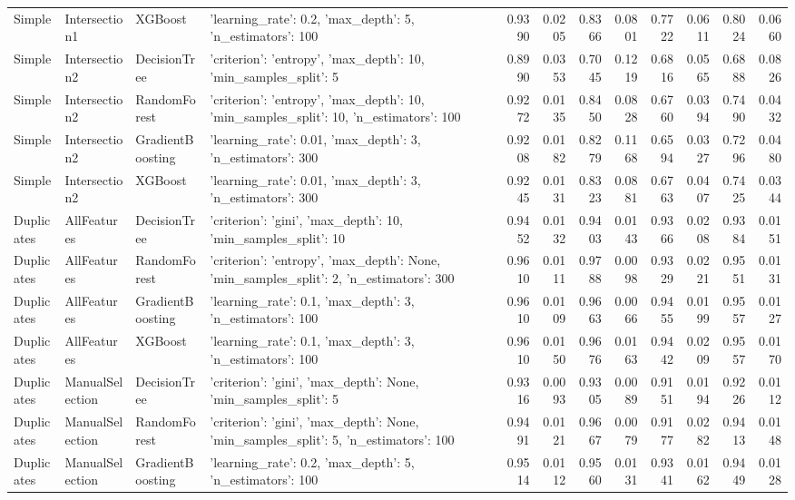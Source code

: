 \begin{tabular}{llllrrrrrrrr}
Simple & Intersection1 & XGBoost & {'learning_rate': 0.2, 'max_depth': 5, 'n_estimators': 100} & 0.9390 & 0.0205 & 0.8366 & 0.0801 & 0.7722 & 0.0611 & 0.8024 & 0.0660 \\
Simple & Intersection2 & DecisionTree & {'criterion': 'entropy', 'max_depth': 10, 'min_samples_split': 5} & 0.8990 & 0.0353 & 0.7045 & 0.1219 & 0.6816 & 0.0565 & 0.6888 & 0.0826 \\
Simple & Intersection2 & RandomForest & {'criterion': 'entropy', 'max_depth': 10, 'min_samples_split': 10, 'n_estimators': 100} & 0.9272 & 0.0135 & 0.8450 & 0.0828 & 0.6760 & 0.0394 & 0.7490 & 0.0432 \\
Simple & Intersection2 & GradientBoosting & {'learning_rate': 0.01, 'max_depth': 3, 'n_estimators': 300} & 0.9208 & 0.0182 & 0.8279 & 0.1168 & 0.6594 & 0.0327 & 0.7296 & 0.0480 \\
Simple & Intersection2 & XGBoost & {'learning_rate': 0.01, 'max_depth': 3, 'n_estimators': 300} & 0.9245 & 0.0131 & 0.8323 & 0.0881 & 0.6763 & 0.0407 & 0.7425 & 0.0344 \\
Duplicates & AllFeatures & DecisionTree & {'criterion': 'gini', 'max_depth': 10, 'min_samples_split': 10} & 0.9452 & 0.0132 & 0.9403 & 0.0143 & 0.9366 & 0.0208 & 0.9384 & 0.0151 \\
Duplicates & AllFeatures & RandomForest & {'criterion': 'entropy', 'max_depth': None, 'min_samples_split': 2, 'n_estimators': 300} & 0.9610 & 0.0111 & 0.9788 & 0.0098 & 0.9329 & 0.0221 & 0.9551 & 0.0131 \\
Duplicates & AllFeatures & GradientBoosting & {'learning_rate': 0.1, 'max_depth': 3, 'n_estimators': 100} & 0.9610 & 0.0109 & 0.9663 & 0.0066 & 0.9455 & 0.0199 & 0.9557 & 0.0127 \\
Duplicates & AllFeatures & XGBoost & {'learning_rate': 0.1, 'max_depth': 3, 'n_estimators': 100} & 0.9610 & 0.0150 & 0.9676 & 0.0163 & 0.9442 & 0.0209 & 0.9557 & 0.0170 \\
Duplicates & ManualSelection & DecisionTree & {'criterion': 'gini', 'max_depth': None, 'min_samples_split': 5} & 0.9316 & 0.0093 & 0.9305 & 0.0089 & 0.9151 & 0.0194 & 0.9226 & 0.0112 \\
Duplicates & ManualSelection & RandomForest & {'criterion': 'gini', 'max_depth': None, 'min_samples_split': 5, 'n_estimators': 100} & 0.9491 & 0.0121 & 0.9667 & 0.0079 & 0.9177 & 0.0282 & 0.9413 & 0.0148 \\
Duplicates & ManualSelection & GradientBoosting & {'learning_rate': 0.2, 'max_depth': 5, 'n_estimators': 100} & 0.9514 & 0.0112 & 0.9560 & 0.0131 & 0.9341 & 0.0162 & 0.9449 & 0.0128 \\

\end{tabular}
